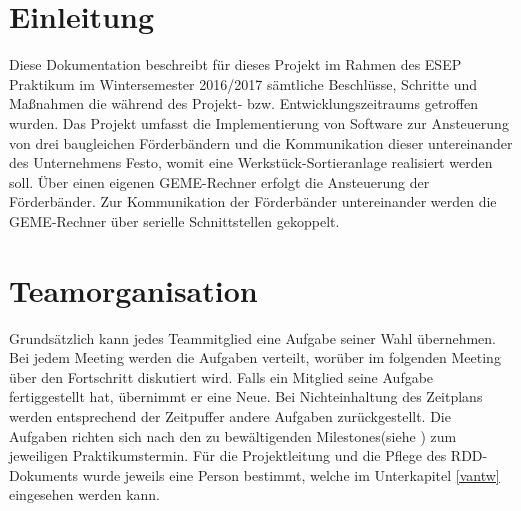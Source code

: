 \documentclass[a4paper, 11pt]{article}
\begin{document}
\newpage

\tableofcontents

\newpage

\section{Einleitung}
Diese Dokumentation beschreibt für dieses Projekt im Rahmen des ESEP Praktikum im Wintersemester 2016/2017 sämtliche Beschlüsse, Schritte und Maßnahmen die während des Projekt- bzw. Entwicklungszeitraums getroffen wurden. Das Projekt umfasst die Implementierung von Software zur Ansteuerung von drei baugleichen Förderbändern und die Kommunikation dieser untereinander des Unternehmens Festo, womit eine Werkstück-Sortieranlage realisiert werden soll. Über einen eigenen GEME-Rechner erfolgt die Ansteuerung der Förderbänder. Zur Kommunikation der Förderbänder untereinander werden die GEME-Rechner über serielle Schnittstellen gekoppelt.

\section{Teamorganisation}
Grundsätzlich kann jedes Teammitglied eine Aufgabe seiner Wahl übernehmen. Bei jedem Meeting werden die Aufgaben verteilt, worüber im folgenden Meeting über den Fortschritt diskutiert wird. Falls ein Mitglied seine Aufgabe fertiggestellt hat, übernimmt er eine Neue. Bei Nichteinhaltung des Zeitplans werden entsprechend der Zeitpuffer andere Aufgaben zurückgestellt. Die Aufgaben richten sich nach den zu bewältigenden Milestones(siehe \cite{esep}) zum jeweiligen Praktikumstermin. Für die Projektleitung und die Pflege des RDD-Dokuments wurde jeweils eine Person bestimmt, welche im Unterkapitel \ref{vantw} eingesehen werden kann.
\end{document}
